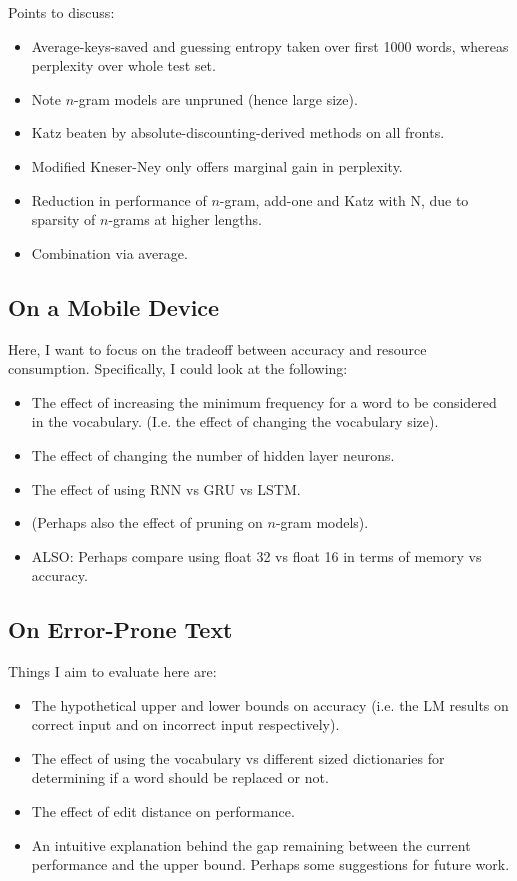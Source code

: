 \documentclass[a4paper, 12pt]{report}
\begin{document}
Points to discuss:
\begin{itemize}
\item
	Average-keys-saved and guessing entropy taken over first 1000 words, whereas perplexity over whole test set.
\item
	Note $n$-gram models are unpruned (hence large size).
\item
	Katz beaten by absolute-discounting-derived methods on all fronts.
\item
	Modified Kneser-Ney only offers marginal gain in perplexity.
\item
	Reduction in performance of $n$-gram, add-one and Katz with N, due to sparsity of $n$-grams at higher lengths.
\item
	Combination via average.
\end{itemize}

\subsection{On a Mobile Device}
Here, I want to focus on the tradeoff between accuracy and resource consumption. Specifically, I could look at the following: \\
\begin{itemize}
\item
	The effect of increasing the minimum frequency for a word to be considered in the vocabulary. (I.e. the effect of changing the vocabulary size).
\item
	The effect of changing the number of hidden layer neurons.
\item
	The effect of using RNN vs GRU vs LSTM.
\item
	(Perhaps also the effect of pruning on $n$-gram models).
\item
	ALSO: Perhaps compare using float 32 vs float 16 in terms of memory vs accuracy.
\end{itemize}

\subsection{On Error-Prone Text}
Things I aim to evaluate here are: \\
\begin{itemize}
\item
	The hypothetical upper and lower bounds on accuracy (i.e. the LM results on correct input and on incorrect input respectively).
\item
	The effect of using the vocabulary vs different sized dictionaries for determining if a word should be replaced or not.
\item
	The effect of edit distance on performance.
\item
	An intuitive explanation behind the gap remaining between the current performance and the upper bound. Perhaps some suggestions for future work.
\end{itemize}
\end{document}
